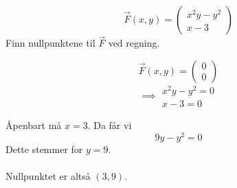 $$\vec{F}(x,y) = \begin{pmatrix} x^2y-y^2 \\ x-3 \end{pmatrix}$$
Finn nullpunktene til $\vec{F}$ ved regning.

$$\vec{F}(x,y) = \begin{pmatrix} 0 \\ 0 \end{pmatrix}$$
$$\implies \begin{matrix} x^2y-y^2=0 \\ x-3=0 \end{matrix}$$

Åpenbart må $x=3$. Da får vi
$$9y-y^2 = 0$$
Dette stemmer for $y=9$.
\\\\
Nullpunktet er altså $(3,9)$.
